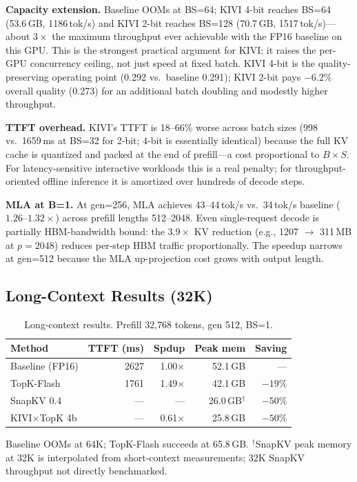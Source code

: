 \documentclass[conference]{IEEEtran}
\begin{document}
\textbf{Capacity extension.}  Baseline OOMs at BS=64; KIVI 4-bit
reaches BS=64 (53.6\,GB, 1186\,tok/s) and KIVI 2-bit reaches BS=128
(70.7\,GB, 1517\,tok/s)---about $3\times$ the maximum throughput ever
achievable with the FP16 baseline on this GPU.  This is the strongest
practical argument for KIVI: it raises the per-GPU concurrency
ceiling, not just speed at fixed batch.  KIVI 4-bit is the
quality-preserving operating point (0.292 vs.\ baseline 0.291); KIVI
2-bit pays $-6.2\%$ overall quality (0.273) for an additional batch
doubling and modestly higher throughput.

\textbf{TTFT overhead.}  KIVI's TTFT is 18--66\% worse across batch
sizes (998 vs.\ 1659\,ms at BS=32 for 2-bit; 4-bit is essentially
identical) because the full KV cache is quantized and packed at the
end of prefill---a cost proportional to $B \times S$.  For
latency-sensitive interactive workloads this is a real penalty; for
throughput-oriented offline inference it is amortized over hundreds of
decode steps.

\textbf{MLA at B=1.}  At gen=256, MLA achieves 43--44\,tok/s vs.\
34\,tok/s baseline ($1.26$--$1.32\times$) across prefill lengths
512--2048.  Even single-request decode is partially HBM-bandwidth
bound: the $3.9\times$ KV reduction (e.g., 1207 \(\rightarrow\) 311\,MB
at $p\!=\!2048$) reduces per-step HBM traffic proportionally.  The
speedup narrows at gen=512 because the MLA up-projection cost grows
with output length.

\subsection{Long-Context Results (32K)}

\begin{table}[!t]
\centering
\caption{Long-context results.  Prefill 32{,}768 tokens, gen 512, BS=1.}
\label{tab:longctx}
\begin{tabular}{@{}lrrrr@{}}
\toprule
\textbf{Method} & \textbf{TTFT (ms)} & \textbf{Spdup} & \textbf{Peak mem} & \textbf{Saving} \\
\midrule
Baseline (FP16)     & 2627 & 1.00$\times$ & 52.1\,GB & --- \\
TopK-Flash          & 1761 & 1.49$\times$ & 42.1\,GB & $-19\%$ \\
SnapKV 0.4          &  --- & ---          & 26.0\,GB$^{\dagger}$ & $-50\%$ \\
KIVI$\times$TopK 4b &  --- & 0.61$\times$ & 25.8\,GB & $-50\%$ \\
\bottomrule
\end{tabular}
\vspace{1pt}
\footnotesize{Baseline OOMs at 64K; TopK-Flash succeeds at 65.8\,GB.
$^{\dagger}$SnapKV peak memory at 32K is interpolated from
short-context measurements; 32K SnapKV throughput not directly
benchmarked.}
\end{table}
\end{document}
